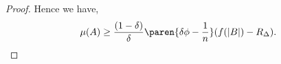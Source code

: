 \begin{proof}
  Hence we have, 
  \begin{equation}
    \label{eq:nastyobliviousamplificationlemmastep1backlog}
  \mu(A) \ge
  \frac{(1-\delta)}{\delta}\paren{\delta\phi-\frac{1}{n}}(f(|B|)-R_\Delta).
  \end{equation}







\end{proof}
